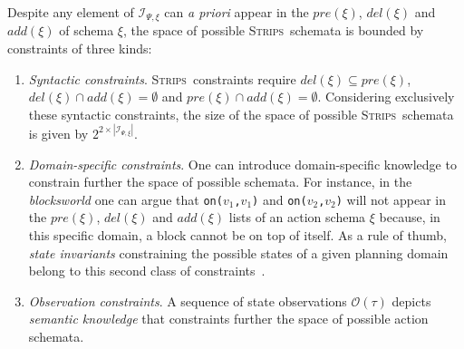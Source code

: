 \documentclass{article}
\newcommand{\strips}{\textsc{Strips}}
\begin{document}
Despite any element of ${\mathcal I}_{\Psi,\xi}$ can {\em a priori} appear in the $pre(\xi)$, $del(\xi)$ and $add(\xi)$ of schema $\xi$, the space of possible \strips\ schemata is bounded by constraints of three kinds:
\begin{enumerate}
\item {\em Syntactic constraints}. \strips\ constraints require $del(\xi)\subseteq pre(\xi)$, $del(\xi)\cap add(\xi)=\emptyset$ and $pre(\xi)\cap add(\xi)=\emptyset$. Considering exclusively these syntactic constraints, the size of the space of possible \strips\ schemata is given by $2^{2\times|{\mathcal I}_{\Psi,\xi}|}$. 
\item {\em Domain-specific constraints}. One can introduce domain-specific knowledge to constrain further the space of possible schemata. For instance, in the {\em blocksworld} one can argue that {\small\tt on($v_1$,$v_1$)} and {\small\tt on($v_2$,$v_2$)} will not appear in the $pre(\xi)$, $del(\xi)$ and $add(\xi)$ lists of an action schema $\xi$ because, in this specific domain, a block cannot be on top of itself. As a rule of thumb, {\it state invariants} constraining the possible states of a given planning domain belong to this second class of constraints~\cite{fox1998automatic}. 
\item {\em Observation constraints}. A sequence of state observations $\mathcal{O}(\tau)$ depicts {\em semantic knowledge} that constraints further the space of possible action schemata. 
\end{enumerate}
\end{document}
